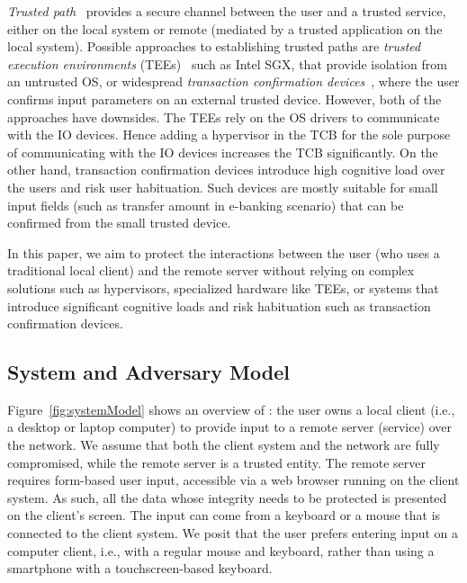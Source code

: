 \emph{Trusted path}~\cite{x86} provides a secure channel between the user and a trusted service, either on the local system or remote (mediated by a trusted application on the local system).
Possible approaches to establishing trusted paths are \textit{trusted execution environments} (TEEs)~\cite{sgxio} such as Intel SGX, that provide isolation from an untrusted OS, or widespread \textit{transaction confirmation devices}~\cite{filyanov2011uni}, where the user confirms input parameters on an external trusted device.
However, both of the approaches have downsides. The TEEs rely on the OS drivers to communicate with the IO devices. Hence adding a hypervisor in the TCB for the sole purpose of communicating with the IO devices increases the TCB significantly. On the other hand, transaction confirmation devices introduce high cognitive load over the users and risk user habituation. Such devices are mostly suitable for small input fields (such as transfer amount in e-banking scenario) that can be confirmed from the small trusted device.

In this paper, we aim to protect the interactions between the user (who uses a traditional local client) and the remote server without relying on complex solutions such as hypervisors, specialized hardware like TEEs, or systems that introduce significant cognitive loads and risk habituation such as transaction confirmation devices.


\subsection{System and Adversary Model}
\label{sec:problemStatement:systemMode}


Figure~\ref{fig:systemModel} shows an overview of \sysname: the user owns a local client (i.e., a desktop or laptop computer) to provide input to a remote server (service) over the network. We assume that both the client system and the network are fully compromised, while the remote server is a trusted entity. The remote server requires form-based user input, accessible via a web browser running on the client system. As such, all the data whose integrity needs to be protected is presented on the client's screen.
The input can come from a keyboard or a mouse that is connected to the client system. We posit that the user prefers entering input on a computer client, i.e., with a regular mouse and keyboard, rather than using a smartphone with a touchscreen-based keyboard.

